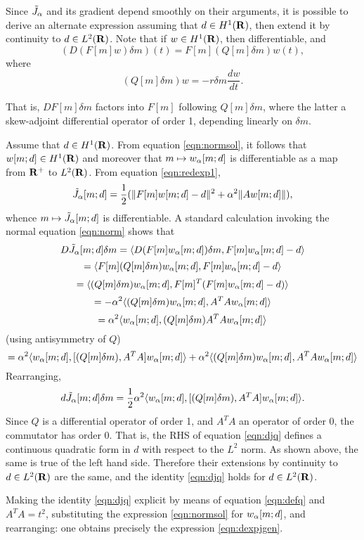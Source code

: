 Since $\tilde{J}_{\alpha}$ and its gradient depend smoothly on their arguments, it
is possible to derive an alternate expression assuming that $d \in
H^1({\bf R})$, then extend it by continuity to $d \in L^2({\bf R})$. Note that
if $w \in H^1({\bf R})$, then
  differentiable, and 
\begin{equation}
\label{eqn:deriv}
(D(F[m]w)\delta m)(t) = F[m](Q[m]\delta m)w (t), 
\end{equation}
where 
\begin{equation}
\label{eqn:defq}
(Q[m]\delta m)w = -r\delta m \frac{dw}{dt}. 
\end{equation}

That is, $DF[m]\delta m$ factors into $F[m]$ following $Q[m]\delta m$,
where the latter a skew-adjoint differential operator of order 1,
depending linearly on $\delta m$.

Assume that $d \in H^1({\bf R})$. From equation \ref{eqn:normsol}, it
follows that $w[m;d] \in H^1({\bf R})$ and moreover that $m \mapsto
w_{\alpha}[m;d]$ is differentiable as a map from ${\bf R}^+$ to
$L^2({\bf R})$. From equation \ref{eqn:redexp1},
\[
  \tilde{J}_{\alpha}[m;d] = \frac{1}{2}(\|F[m]w[m;d]-d\|^2 + \alpha^2 \|Aw[m;d]\|),
\]
whence $m \mapsto \tilde{J}_{\alpha}[m;d]$ is differentiable. A standard calculation
invoking the normal equation \ref{eqn:norm} shows that
\[
  D\tilde{J}_{\alpha}[m;d]\delta m = \langle D(F[m]w_{\alpha}[m;d])\delta m, F[m]w_{\alpha}[m;d]-d\rangle
\]
\[
  = \langle F[m](Q[m]\delta m)w_{\alpha}[m;d], F[m]w_{\alpha}[m;d]-d\rangle
\]
\[
  = \langle (Q[m]\delta m)w_{\alpha}[m;d], F[m]^T(F[m]w_{\alpha}[m;d]-d)\rangle
\]
\[
  = -\alpha^2\langle (Q[m]\delta m)w_{\alpha}[m;d],A^TAw_{\alpha}[m;d] \rangle
\]
\[
  = \alpha^2 \langle w_{\alpha}[m;d], (Q[m]\delta m)A^TA w_{\alpha}[m;d]\rangle
\]
(using antisymmetry of $Q$)
\[
  = \alpha^2 \langle w_{\alpha}[m;d],[ (Q[m]\delta m), A^TA]w_{\alpha}[m;d] \rangle
  + \alpha^2 \langle (Q[m]\delta m)w_{\alpha}[m;d],A^TAw_{\alpha}[m;d] \rangle
\]
Rearranging,
\begin{equation}
  \label{eqn:djq}
  d\tilde{J}_{\alpha}[m;d]\delta m = \frac{1}{2}\alpha^2 \langle w_{\alpha}[m;d],[
  (Q[m]\delta m), A^TA]w_{\alpha}[m;d] \rangle.
\end{equation}
Since $Q$ is a differential operator of order 1, and $A^TA$ an
operator of order 0, the commutator has order 0. That is, the RHS of
equation \ref{eqn:djq} defines a continuous quadratic form in $d$ with
respect to the $L^2$ norm. As shown above, the same is true of the
left hand side. Therefore their extensions by continuity to $d \in
L^2({\bf R})$ are the same, and the identity \ref{eqn:djq} holds for $d
\in L^2({\bf R})$.

Making the identity \ref{eqn:djq} explicit by means of equation
\ref{eqn:defq} and $A^TA = t^2$, substituting the expression
\ref{eqn:normsol} for $w_{\alpha}[m;d]$, and rearranging: one obtains
precisely the expression \ref{eqn:dexpjgen}.

